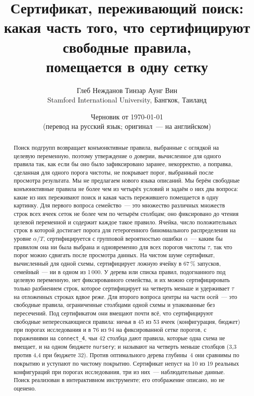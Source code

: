 \documentclass[11pt]{article}
\title{Сертификат, переживающий поиск:\\
какая часть того, что сертифицируют свободные правила,\\ помещается в одну сетку}
\author{Глеб Нежданов \quad Тинзар Аунг Вин\\[3pt]
\normalsize Stamford International University, Бангкок, Таиланд}
\date{Черновик от \today\\[2pt]\small(перевод на русский язык; оригинал~--- на английском)}
\begin{document}
\maketitle

\begin{abstract}
Поиск подгрупп возвращает конъюнктивные правила, выбранные с оглядкой на целевую переменную, поэтому утверждение о доверии, вычисленное для одного правила так, как если бы оно было зафиксировано заранее, некорректно, а поправка, сделанная для одного порога чистоты, не покрывает порог, выбранный после просмотра результата. Мы не предлагаем нового языка описаний. Мы берём свободные конъюнктивные правила не более чем из четырёх условий и задаём о них два вопроса: какие из них переживают поиск и какая часть пережившего помещается в одну картинку. Для первого вопроса семейство~--- это множество различных множеств строк всех ячеек сеток не более чем по четырём столбцам; оно фиксировано до чтения целевой переменной и содержит каждое такое правило. Ячейка, число положительных строк в которой достигает порога для гетерогенного биномиального распределения на уровне $\alpha/T$, сертифицируется с групповой вероятностью ошибки $\alpha$~--- каким бы правилом она ни была выбрана и одновременно для всех порогов чистоты $\tau$, так что порог можно сдвигать после просмотра данных. На чистом шуме сертификат, вычисленный для одной схемы, сертифицирует ложную ячейку в 67\,\% запусков, семейный~--- ни в одном из 1\,000. У дерева или списка правил, подогнанного под целевую переменную, нет фиксированного семейства, и их можно сертифицировать только разбиением строк, которое сертифицирует на четверть меньше и удерживает $\tau$ на отложенных строках вдвое реже. Для второго вопроса центры на части осей~--- это свободные правила, ограниченные столбцами одной схемы и упакованные без пересечений. Под сертификатом они вмещают почти всё, что сертифицируют свободные непересекающиеся правила: ничья в 45 из 53 ячеек (конфигурация, бюджет) при порогах исследования и в 76 из 94 на фиксированной сетке порогов, с поражениями на \texttt{connect\_4}, чьи 42 столбца дают правила, которые одна схема не вмещает, и на одном бюджете \texttt{nursery}; и называют на четверть меньше столбцов (3,3 против 4,4 при бюджете 32). Против оптимального дерева глубины~4 они сравнимы по покрытию и уступают по чистому покрытию. Сертификат непуст на 10 из 19 реальных конфигураций при порогах исследования, три из них~--- наблюдательные данные. Поиск реализован в интерактивном инструменте; его отображение описано, но не оценено.
\end{abstract}
\end{document}
